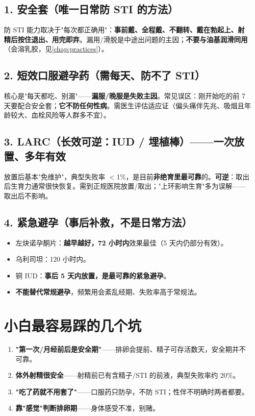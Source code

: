 \documentclass[12pt,UTF8,openany]{ctexbook}
\begin{document}
\subsection*{1. 安全套（唯一日常防 STI 的方法）}

防 STI 能力取决于"每次都正确用"：\textbf{事前戴、全程戴、不翻转、戴在勃起上、射精后按住退出、用完即弃}。漏用/滑脱是中途出问题的主因；\textbf{不要与油基润滑同用}（会溶乳胶，见\ref{chap:practices}）。

\subsection*{2. 短效口服避孕药（需每天、防不了 STI）}

核心是"每天都吃、别漏"——\textbf{漏服/晚服是失败主因}。常见误区：刚开始吃的前 7 天要配合安全套；\textbf{它不防任何性病}。需医生评估适应证（偏头痛伴先兆、吸烟且年龄较大、血栓风险等人群多不宜）。

\subsection*{3. LARC（长效可逆：IUD / 埋植棒）——一次放置、多年有效}

放置后基本"免维护"，典型失败率 $<$1\%，是目前\textbf{非绝育里最可靠}的。\textbf{可逆}：取出后生育力通常很快恢复。需到正规医院放置/取出；"上环影响生育"多为误解——取出后不影响。

\subsection*{4. 紧急避孕（事后补救，不是日常方法）}

\begin{itemize}[leftmargin=2em,itemsep=0.3em]
  \item 左炔诺孕酮片：\textbf{越早越好，72 小时内}效果最佳（5 天内仍部分有效）。
  \item 乌利司坦：120 小时内。
  \item 铜 IUD：\textbf{事后 5 天内放置，是最可靠的紧急避孕}。
  \item \textbf{不能替代常规避孕}，频繁用会紊乱经期、失败率高于常规法。
\end{itemize}

\section{小白最容易踩的几个坑}

\begin{enumerate}[leftmargin=2em,itemsep=0.3em]
  \item \textbf{"第一次/月经前后是安全期"}——排卵会提前、精子可存活数天，安全期并不可靠。
  \item \textbf{体外射精很安全}——射精前已有含精子/STI 的前液，典型失败率约 20\%。
  \item \textbf{"吃了药就不用套了"}——口服药只防孕，不防 STI；性伴不明确时两者都要。
  \item \textbf{靠"感觉"判断排卵期}——身体感受不准，别赌。
\end{enumerate}
\end{document}

